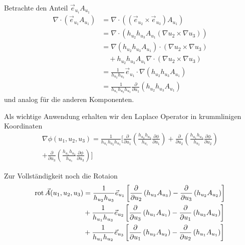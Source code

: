 \begin{info}
Betrachte den Anteil $\vec{e}_{u_i} A_{u_1}$
\begin{align*}
\nabla\cdot(\vec{e}_{u_1} A_{u_1}) &=
\nabla\cdot((\vec{e}_{u_2} \times \vec{e}_{u_3})A_{u_1}) \\
&= \nabla\cdot(h_{u_2} h_{u_3} A_{u_1} (\nabla u_2 \times \nabla u_3))\\
&= \nabla(h_{u_2} h_{u_3} A_{u_1})\cdot(\nabla u_2 \times \nabla u_3) \\ &
\quad + h_{u_2} h_{u_3} A_{u_1} \nabla \cdot (\nabla u_2 \times \nabla u_3)\\
&= \frac{1}{h_{u_2} h_{u_3}}\vec{e}_{u_1}\cdot\nabla(h_{u_2} h_{u_3} A_{u_1})\\
&= \frac{1}{h_{u_1} h_{u_2} h_{u_3}} \frac{\partial}{\partial u_1} (h_{u_2}
h_{u_3} A_{u_1})
\end{align*}
und analog für die anderen Komponenten.
\end{info}

\begin{Definition}
Als wichtige Anwendung erhalten wir den Laplace Operator in krummlinigen
Koordinaten
\begin{align*}
\nabla\phi(u_1,u_2,u_3) = \frac{1}{h_{u_1} h_{u_2}
h_{u_3}}\big[\frac{\partial}{\partial u_1}\left(\frac{h_{u_2}
h_{u_3}}{h_{u_1}} \frac{\partial \phi}{\partial u_1}\right) +
\frac{\partial}{\partial u_2}\left(\frac{h_{u_1}
h_{u_3}}{h_{u_2}} \frac{\partial \phi}{\partial u_2}\right) \\+
\frac{\partial}{\partial u_3}\left(\frac{h_{u_1}
h_{u_2}}{h_{u_3}} \frac{\partial \phi}{\partial u_3}\right)
 \big]
\end{align*}
\end{Definition}

\begin{Definition}[Rotaion]
Zur Vollständigkeit noch die Rotaion
\begin{align*}
\operatorname{rot} \vec{A}(u_1,u_2,u_3) &= \frac{1}{h_{u_2}
h_{u_3}}\vec{e}_{u_1}\left[\frac{\partial}{\partial u_2}\left(h_{u_3}
A_{u_3}\right) - \frac{\partial}{\partial u_3}\left(h_{u_2}
A_{u_2}\right)\right]\\
& + \frac{1}{h_{u_1}
h_{u_3}}\vec{e}_{u_2}\left[\frac{\partial}{\partial u_3}\left(h_{u_1}
A_{u_1}\right) - \frac{\partial}{\partial u_1}\left(h_{u_3}
A_{u_3}\right)\right]\\
& + \frac{1}{h_{u_1}
h_{u_2}}\vec{e}_{u_3}\left[\frac{\partial}{\partial u_1}\left(h_{u_2}
A_{u_2}\right) - \frac{\partial}{\partial u_2}\left(h_{u_1}
A_{u_1}\right)\right]
\end{align*}
\end{Definition}

